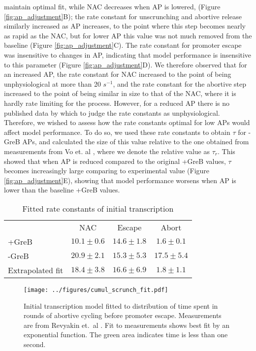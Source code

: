 maintain optimal fit, while NAC decreases when AP is lowered, (Figure
\ref{fig:ap_adjustment}B); the rate constant for unscrunching
and abortive release similarly increased as AP increases, to the point where
this step becomes nearly as rapid as the NAC, but for lower AP this value was
not much removed from the baseline (Figure \ref{fig:ap_adjustment}C). The rate
constant for promoter escape was insensitive to changes in AP, indicating that
model performance is insensitive to this parameter (Figure
\ref{fig:ap_adjustment}D). We therefore observed that for an increased AP, the
rate constant for NAC increased to the point of being unphysiological at more
than 20 $s^{-1}$, and the rate constant for the abortive step increased to the
point of being similar in size to that of the NAC, where it is hardly rate
limiting for the process. However, for a reduced AP there is no published data
by which to judge the rate constants as unphysiological. Therefore, we wished
to assess how the rate constants optimal for low APs would affect model
performance. To do so, we used these rate constants to obtain $\tau$ for -GreB
APs, and calculated the size of this value relative to the one obtained from
measurements from Vo et. al \cite{vo_vitro_2003-1}, where we denote the
relative value as $\tau_r$. This showed that when AP is reduced compared to the
original +GreB values, $\tau$ becomes increasingly large comparing to 
experimental value (Figure \ref{fig:ap_adjustment}E), showing that model
performance worsens when AP is lower than the baseline +GreB values.

\begin{table}
  \label{tab:param_fit_revyakin}
  \caption{Fitted rate constants of initial transcription}
  \begin{center}
    \begin{tabular}{lccc}
       \toprule
       & NAC & Escape & Abort \\
       +GreB & $10.1 \pm 0.6$ & $14.6 \pm 1.8$ & $1.6 \pm 0.1$ \\
       -GreB & $20.9 \pm 2.1$ & $15.3 \pm 5.3$ & $17.5 \pm 5.4$ \\
       Extrapolated fit & $18.4 \pm 3.8$ & $16.6 \pm 6.9$ & $1.8 \pm 1.1$ \\
    \end{tabular}
  \end{center}
\end{table}

\begin{figure}
    \begin{center}
      \texttt{[image: ../figures/cumul\_scrunch\_fit.pdf]}
    \end{center}
    \caption{Initial transcription model fitted to distribution of time spent
      in rounds of abortive cycling before promoter escape. Measurements are
      from Revyakin et.\ al \cite{revyakin_abortive_2006}. Fit to measurements
      shows best fit by an exponential function. The green area indicates time
      is less than one second.}
\label{fig:revyakin_fit}
\end{figure}


